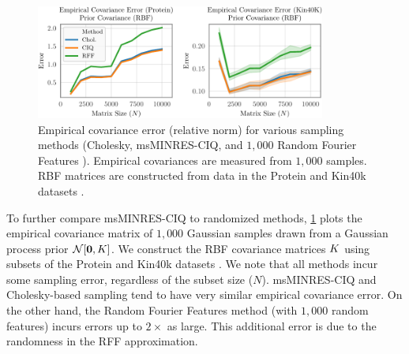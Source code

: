 \begin{figure}[ht!]
	\centering
	\includegraphics[width=0.85\textwidth]{figures/empirical_covariance_prior.pdf}
  \caption{
    Empirical covariance error (relative norm) for various sampling methods (Cholesky, msMINRES-CIQ, and $1,\!000$ Random Fourier Features \cite{rahimi2008random}).
    Empirical covariances are measured from $1,\!000$ samples.
    RBF matrices are constructed from data in the Protein and Kin40k datasets \cite{asuncion2007uci}.
  }
  \label{fig:empirical_covariance_matrix}
\end{figure}

To further compare msMINRES-CIQ to randomized methods, \cref{fig:empirical_covariance_matrix} plots the empirical covariance matrix of $1,\!000$ Gaussian samples drawn from a Gaussian process prior $\normaldist{\bzero}{\bK}$.
We construct the RBF covariance matrices $K$ using subsets of the Protein and Kin40k datasets \cite{asuncion2007uci}.
We note that all methods incur some sampling error, regardless of the subset size ($N$).
msMINRES-CIQ and Cholesky-based sampling tend to have very similar empirical covariance error.
On the other hand, the Random Fourier Features method \cite{rahimi2008random} (with $1,\!000$ random features) incurs errors up to $2\times$ as large.
This additional error is due to the randomness in the RFF approximation.

